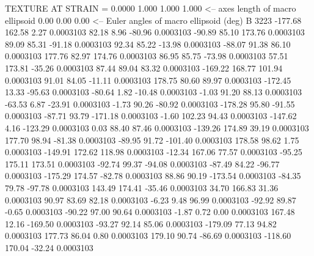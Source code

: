 TEXTURE AT STRAIN =    0.0000
   1.000   1.000   1.000  <-- axes length of macro ellipsoid
    0.00    0.00    0.00  <-- Euler angles of macro ellipsoid (deg)
B      3223
     -177.68      162.58        2.27     0.0003103
       82.18        8.96      -80.96     0.0003103
      -90.89       85.10      173.76     0.0003103
       89.09       85.31      -91.18     0.0003103
       92.34       85.22      -13.98     0.0003103
      -88.07       91.38       86.10     0.0003103
      177.76       82.97      174.76     0.0003103
       86.95       85.75      -73.98     0.0003103
       57.51      173.81      -35.26     0.0003103
       87.44       89.04       83.32     0.0003103
     -169.22      168.77      101.94     0.0003103
       91.01       84.05      -11.11     0.0003103
      178.75       80.60       89.97     0.0003103
     -172.45       13.33      -95.63     0.0003103
      -80.64        1.82      -10.48     0.0003103
       -1.03       91.20       88.13     0.0003103
      -63.53        6.87      -23.91     0.0003103
       -1.73       90.26      -80.92     0.0003103
     -178.28       95.80      -91.55     0.0003103
      -87.71       93.79     -171.18     0.0003103
       -1.60      102.23       94.43     0.0003103
     -147.62        4.16     -123.29     0.0003103
        0.03       88.40       87.46     0.0003103
     -139.26      174.89       39.19     0.0003103
      177.70       98.94      -81.38     0.0003103
      -89.95       91.72     -101.40     0.0003103
      178.58       98.62        1.75     0.0003103
     -149.91      172.62      118.98     0.0003103
      -12.34      167.06       77.57     0.0003103
      -95.25      175.11      173.51     0.0003103
      -92.74       99.37      -94.08     0.0003103
      -87.49       84.22      -96.77     0.0003103
     -175.29      174.57      -82.78     0.0003103
       88.86       90.19     -173.54     0.0003103
      -84.35       79.78      -97.78     0.0003103
      143.49      174.41      -35.46     0.0003103
       34.70      166.83       31.36     0.0003103
       90.97       83.69       82.18     0.0003103
       -6.23        9.48       96.99     0.0003103
      -92.92       89.87       -0.65     0.0003103
      -90.22       97.00       90.64     0.0003103
       -1.87        0.72        0.00     0.0003103
      167.48       12.16     -169.50     0.0003103
      -93.27       92.14       85.06     0.0003103
     -179.09       77.13       94.82     0.0003103
      177.73       86.04        0.80     0.0003103
      179.10       90.74      -86.69     0.0003103
     -118.60      170.04      -32.24     0.0003103
